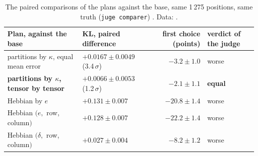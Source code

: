 \begin{table}[tbp]
\centering\footnotesize\setlength{\tabcolsep}{3pt}
\begin{tabularx}{\linewidth}{@{}>{\raggedright\arraybackslash}X l r l@{}}
\toprule
Plan, against the base & KL, paired difference & first choice (points) & verdict of the judge \\
\midrule
partitions by $\kappa$, equal mean error & $+0.0167 \pm 0.0049$ (3.4\,$\sigma$) & $-3.2 \pm 1.0$ & worse \\
\textbf{partitions by $\kappa$, tensor by tensor} & $\mathbf{+0.0066 \pm 0.0053}$ (1.2\,$\sigma$) & $-2.1 \pm 1.1$ & \textbf{equal} \\
Hebbian by $e$ & $+0.131 \pm 0.007$ & $-20.8 \pm 1.4$ & worse \\
Hebbian $(e,$ row, column$)$ & $+0.128 \pm 0.007$ & $-22.2 \pm 1.4$ & worse \\
Hebbian $(\delta,$ row, column$)$ & $+0.027 \pm 0.004$ & $-8.2 \pm 1.2$ & worse \\
\bottomrule
\end{tabularx}
\caption[The paired comparisons of the plans]{The paired comparisons of the plans against the base, same 1\,275 positions, same truth (\texttt{juge comparer}) \mes. Data: .}
\label{t3pre:tab:apparie}
\end{table}

